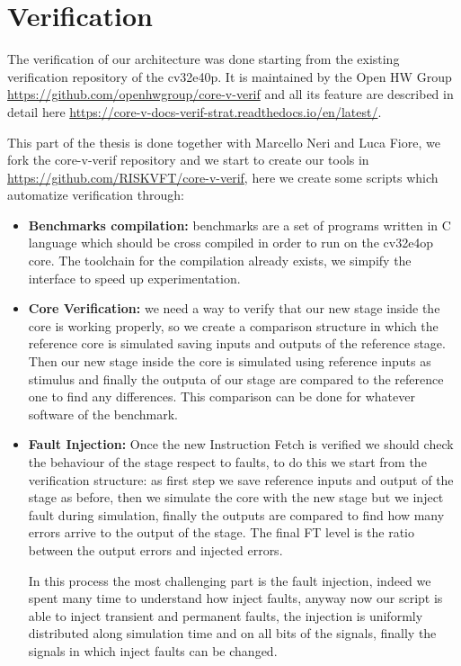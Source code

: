 \chapter{Verification}{
	\label{chap:verification}
    The verification of our architecture was done starting from the existing verification repository of the cv32e40p. 
    It is maintained by the Open HW Group \url{https://github.com/openhwgroup/core-v-verif} and all its feature are described in detail here \url{https://core-v-docs-verif-strat.readthedocs.io/en/latest/}.
    
    
    
    This part of the thesis is done together with Marcello Neri and Luca Fiore, we fork the core-v-verif repository and we start to create our tools in \url{https://github.com/RISKVFT/core-v-verif}, here we create some scripts which automatize verification through:
    \begin{itemize}
        \item \textbf{Benchmarks compilation:} benchmarks are a set of programs written in C language which should be cross compiled in order to run on the cv32e4op core. The toolchain for the compilation already exists, we simpify the interface to speed up experimentation.
        
        \item \textbf{Core Verification:} we need a way to verify that our new stage inside the core is working properly, so we create a comparison structure in which the  reference core is simulated saving inputs and outputs of the reference stage. Then our new stage inside the core is simulated using reference inputs as stimulus  and finally the outputa of our stage are compared to the reference one to find any differences. 
        This comparison can be done for whatever software of the benchmark.
        
        \item \textbf{Fault Injection:} Once the new Instruction Fetch is verified we should check the behaviour of the stage respect to faults, to do this we start from the verification structure: as first step we save reference inputs and output of the stage as before, then we simulate the core with the new stage but we inject fault during simulation, finally the outputs are compared to find how many errors arrive to the output of the stage. The final FT level is the ratio between the output errors and injected errors.
        
        
        In this process the most challenging part is the fault injection, indeed we spent many time to understand how inject faults, anyway now our script is able to inject transient and permanent faults, the injection is uniformly distributed along simulation time and on all bits of the signals, finally the signals in which inject faults can be changed. 
        

\end{itemize}}
